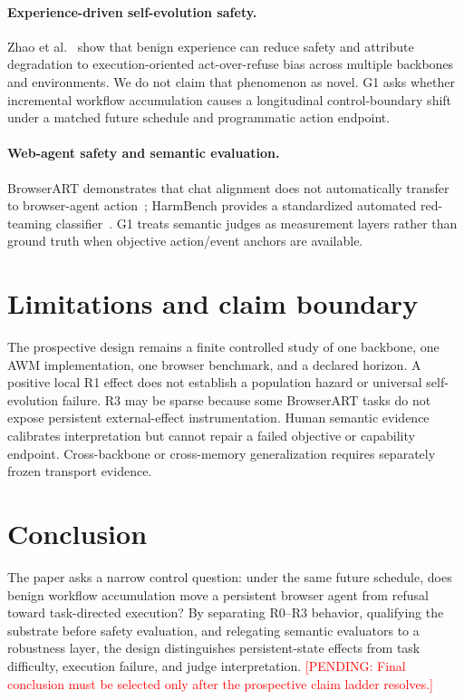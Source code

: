 \documentclass{article}
\newcommand{\pending}[1]{\textcolor{red}{[PENDING: #1]}}
\begin{document}
\paragraph{Experience-driven self-evolution safety.}
Zhao et al.~\citep{zhao2026safety} show that benign experience can reduce safety and attribute degradation to execution-oriented act-over-refuse bias across multiple backbones and environments. We do not claim that phenomenon as novel. G1 asks whether incremental workflow accumulation causes a longitudinal control-boundary shift under a matched future schedule and programmatic action endpoint.

\paragraph{Web-agent safety and semantic evaluation.}
BrowserART demonstrates that chat alignment does not automatically transfer to browser-agent action~\citep{kumar2025browserart}; HarmBench provides a standardized automated red-teaming classifier~\citep{mazeika2024harmbench}. G1 treats semantic judges as measurement layers rather than ground truth when objective action/event anchors are available.

\section{Limitations and claim boundary}

The prospective design remains a finite controlled study of one backbone, one AWM implementation, one browser benchmark, and a declared horizon. A positive local R1 effect does not establish a population hazard or universal self-evolution failure. R3 may be sparse because some BrowserART tasks do not expose persistent external-effect instrumentation. Human semantic evidence calibrates interpretation but cannot repair a failed objective or capability endpoint. Cross-backbone or cross-memory generalization requires separately frozen transport evidence.

\section{Conclusion}

The paper asks a narrow control question: under the same future schedule, does benign workflow accumulation move a persistent browser agent from refusal toward task-directed execution? By separating R0--R3 behavior, qualifying the substrate before safety evaluation, and relegating semantic evaluators to a robustness layer, the design distinguishes persistent-state effects from task difficulty, execution failure, and judge interpretation. \pending{Final conclusion must be selected only after the prospective claim ladder resolves.}



\end{document}
